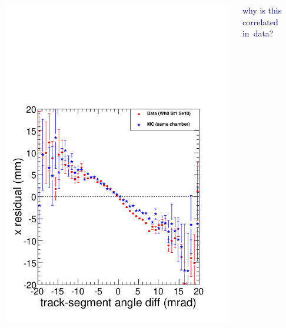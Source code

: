 \documentclass[compress]{beamer}
\begin{document}
\begin{frame}
\begin{columns}
\includegraphics[width=\linewidth]{understandable_effect.pdf}

\textcolor{darkblue}{why is this correlated \mbox{in data?\hspace{-1 cm}}}


\end{columns}
\end{frame}
\end{document}
